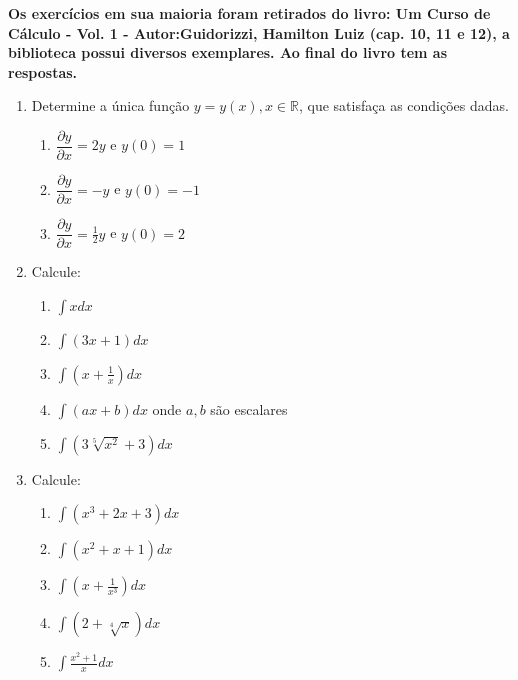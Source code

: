 \documentclass[oneside,a4paper,12pt]{article}
\begin{document}
	\begin{center}
		{\bf Os exercícios em sua maioria foram retirados do livro: Um Curso de Cálculo - Vol. 1 - Autor:Guidorizzi, Hamilton Luiz (cap. 10, 11 e 12), a biblioteca possui diversos exemplares. Ao final do livro tem as respostas. }
	\end{center}
\begin{enumerate}
	
	\item Determine a única função $y = y(x), x \in \mathbb{R}$, que satisfaça as condições dadas.
	\begin{enumerate}
		\item $\dfrac{\partial y}{\partial x}= 2y$ e $y(0) = 1$
		\item $\dfrac{\partial y}{\partial x}= -y$ e $y(0) = -1$
		\item $\dfrac{\partial y}{\partial x}= \frac{1}{2}y$ e $y(0) = 2$
	\end{enumerate}
	
	\item Calcule:
	\begin{multicols}{2}
		\begin{enumerate}
			\item $\displaystyle \int x dx$
			\item $\displaystyle \int (3x + 1)dx$
			\item $\displaystyle \int (x + \frac{1}{x})dx$
			\item $\displaystyle \int (ax + b)dx$ onde $a,b$ são escalares
			\item $\displaystyle \int (3\sqrt[5]{x^2} +3)dx$
		\end{enumerate}
	\end{multicols}
	
	\item Calcule:
	\begin{multicols}{2}
		\begin{enumerate}
			\item $\displaystyle \int (x^3 + 2x +3)dx$
			\item $\displaystyle \int (x^2 + x +1)dx$
			\item $\displaystyle \int (x + \frac{1}{x^3})dx$
			\item $\displaystyle \int (2 + \sqrt[4]{x})dx$
			\item $\displaystyle \int \frac{x^2 + 1}{x}dx$
		\end{enumerate}
	\end{multicols}
	

\end{enumerate}
\end{document}
